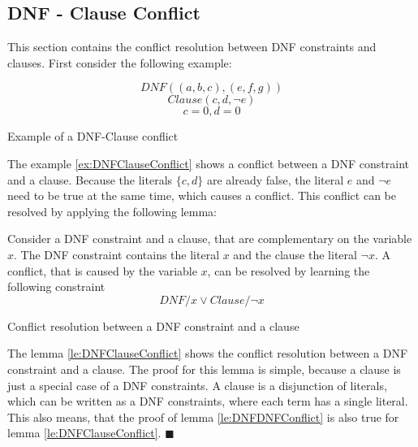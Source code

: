 \subsection{DNF - Clause Conflict}

This section contains the conflict resolution between DNF constraints and clauses. First consider the following example:

\begin{example}
\begin{leftbar}
\begin{displaymath}
DNF((a,b,c),(e,f,g))
\end{displaymath}
\begin{displaymath}
Clause(c,d,\neg e)
\end{displaymath}
\begin{displaymath}
c = 0, d = 0
\end{displaymath}
\end{leftbar}
\caption{Example of a DNF-Clause conflict}
\label{ex:DNFClauseConflict}
\end{example}

The example \ref{ex:DNFClauseConflict} shows a conflict between a DNF constraint and a clause. Because the literals $\{c,d\}$ are already false, the literal $e$ and $\neg e$ need to be true at the same time, which causes a conflict. This conflict can be resolved by applying the following lemma:



\begin{lemma}
\begin{leftbar}
Consider a DNF constraint and a clause, that are complementary on the variable $x$. The DNF constraint contains the literal $x$ and the clause the literal $\neg x$. A conflict, that is caused by the variable $x$, can be resolved by learning the following constraint
\begin{displaymath}
DNF / x \vee Clause / \neg x
\end{displaymath}
\end{leftbar}
\caption{Conflict resolution between a DNF constraint and a clause}
\label{le:DNFClauseConflict}
\end{lemma}

The lemma \ref{le:DNFClauseConflict} shows the conflict resolution between a DNF constraint and a clause. The proof for this lemma is simple, because a clause is just a special case of a DNF constraints. A clause is a disjunction of literals, which can be written as a DNF constraints, where each term has a single literal. This also means, that the proof of lemma \ref{le:DNFDNFConflict} is also true for lemma \ref{le:DNFClauseConflict}. $\blacksquare$

